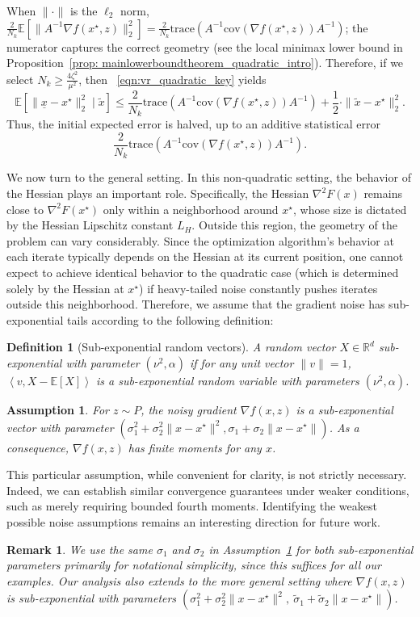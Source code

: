 \documentclass[11pt,twoside]{article}
\numberwithin{equation}{section}
\newcommand{\EE}{\mathbb{E}}
\newcommand{\trace}[1]{\mathrm{trace}\left(#1\right)}
\newcommand{\RR}{\mathbb{R}}
\newcommand{\1}{\mathbf{1}}
\newcommand{\dotp}[1]{\left\langle #1\right\rangle}
\newtheorem{definition}[theorem]{Definition}
\newtheorem{assumption}{Assumption}
\newtheorem{remark}{Remark}
\theoremstyle{remark}
\theoremstyle{plain}
\newcommand{\cov}{\mathrm{cov}}
\newcommand{\liph}{L_H}
\begin{document}
When $\|\cdot\|$ is the $\ell_2$ norm, $\frac{2}{N_k} \EE[\|A^{-1}\nabla f(x^\star,z) \|_2^2]  = \frac{2}{N_k} \trace{A^{-1}\cov(\nabla f(x^\star,z)) A^{-1}}$; the numerator captures the correct geometry (see the local minimax lower bound in Proposition~\ref{prop: mainlowerboundtheorem_quadratic_intro}). Therefore, if we select $N_k \ge \frac{4\zeta^2}{\mu^2}$, then ~\eqref{eqn:vr_quadratic_key} yields  
$$
\EE[\|\underline{x} - x^\star\|_2^2 \mid \tilde x] \le \frac{2}{N_k} \trace{A^{-1}\cov(\nabla f(x^\star,z)) A^{-1}}+ \frac{1}{2}\cdot \|\tilde x - x^\star\|_2^2.
$$  
Thus, the initial expected error is halved, up to an additive statistical error 
$$\frac{2}{N_k}\trace{A^{-1}\cov(\nabla f(x^\star,z)) A^{-1}}.$$ 



We now turn to the general setting. In this non-quadratic setting, the behavior of the Hessian plays an important role. Specifically, the Hessian $\nabla^2 F(x)$ remains close to $\nabla^2 F(x^\star)$ only within a neighborhood around $x^\star$, whose size is dictated by the Hessian Lipschitz constant $\liph$. Outside this region, the geometry of the problem can vary considerably. Since the optimization algorithm's behavior at each iterate typically depends on the Hessian at its current position, one cannot expect to achieve identical behavior to the quadratic case (which is determined solely by the Hessian at $x^\star$) if heavy-tailed noise constantly pushes iterates outside this neighborhood. Therefore, we assume that the gradient noise has sub-exponential tails according to the following definition:
\begin{definition}[Sub-exponential random vectors]
A random vector $X \in \RR^d$ sub-exponential with parameter $(\nu^2, \alpha)$ if for any unit vector $\| v\| = 1$, $\dotp{v, X - \EE[X]}$ is a sub-exponential random variable with parameters $(\nu^2,\alpha)$.
\end{definition}
\begin{assumption}\label{assum:light_tail_non_quadratic}
For $z \sim P$, the  noisy gradient  $\nabla f(x, z)$ is a sub-exponential vector with parameter $(\sigma_1^2 + \sigma_2^2 \|x - x^\star\|^2, \sigma_1 + \sigma_2 \| x- x^\star\|)$.
As a consequence, $\nabla f(x,z)$ has finite moments for any $x$. 
\end{assumption}
This particular assumption, while convenient for clarity, is not strictly necessary. Indeed, we can establish similar convergence guarantees under weaker conditions, such as merely requiring bounded fourth moments. Identifying the weakest possible noise assumptions remains an interesting direction for future work.
\begin{remark}
We use the same $\sigma_1$ and $\sigma_2$ in Assumption~\ref{assum:light_tail_non_quadratic} for both sub-exponential parameters primarily for notational simplicity, since this suffices for all our examples. Our analysis also extends to the more general setting where $\nabla f(x, z)$ is sub-exponential with parameters $(\sigma_1^2 + \sigma_2^2\|x - x^\star\|^2,\ \tilde{\sigma}_1 + \tilde{\sigma}_2 \|x - x^\star\|)$.
\end{remark}
\end{document}

